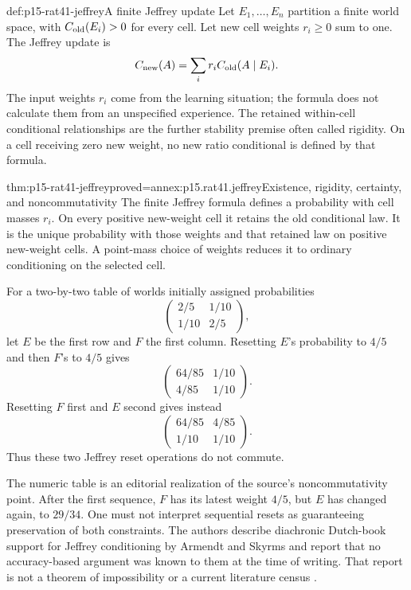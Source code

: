 \begin{hbdefinition}{def:p15-rat41-jeffrey}{A finite Jeffrey update}
Let \(E_1,\ldots,E_n\) partition a finite world space, with
\(C_{\rm old}(E_i)>0\) for every cell. Let new cell weights
\(r_i\geq0\) sum to one. The Jeffrey update is
\[
 C_{\rm new}(A)=\sum_i r_i C_{\rm old}(A\mid E_i).
\]
The input weights \(r_i\) come from the learning situation; the formula
does not calculate them from an unspecified experience. The retained
within-cell conditional relationships are the further stability premise
often called rigidity. On a cell receiving zero new weight, no new
ratio conditional is defined by that formula.
\end{hbdefinition}

\begin{hbtheorem}{thm:p15-rat41-jeffrey}{proved=annex:p15.rat41.jeffrey}{Existence, rigidity, certainty, and noncommutativity}
The finite Jeffrey formula defines a probability with cell masses
\(r_i\). On every positive new-weight cell it retains the old
conditional law. It is the unique probability with those weights and
that retained law on positive new-weight cells. A point-mass choice of
weights reduces it to ordinary conditioning on the selected cell.

For a two-by-two table of worlds initially assigned probabilities
\[
             \begin{pmatrix}2/5&1/10\\1/10&2/5\end{pmatrix},
\]
let \(E\) be the first row and \(F\) the first column. Resetting
\(E\)'s probability to \(4/5\) and then \(F\)'s to \(4/5\) gives
\[
             \begin{pmatrix}64/85&1/10\\4/85&1/10\end{pmatrix}.
\]
Resetting \(F\) first and \(E\) second gives instead
\[
             \begin{pmatrix}64/85&4/85\\1/10&1/10\end{pmatrix}.
\]
Thus these two Jeffrey reset operations do not commute.
\end{hbtheorem}

The numeric table is an editorial realization of the source's
noncommutativity point. After the first sequence, \(F\) has its latest
weight \(4/5\), but \(E\) has changed again, to \(29/34\). One must
not interpret sequential resets as guaranteeing preservation of both
constraints. The authors describe diachronic Dutch-book support for
Jeffrey conditioning by Armendt and Skyrms and report that no
accuracy-based argument was known to them at the time of writing.
That report is not a theorem of impossibility or a current literature
census
\parencite[p.~245]{HajekStaffel2021Dynamics}.

